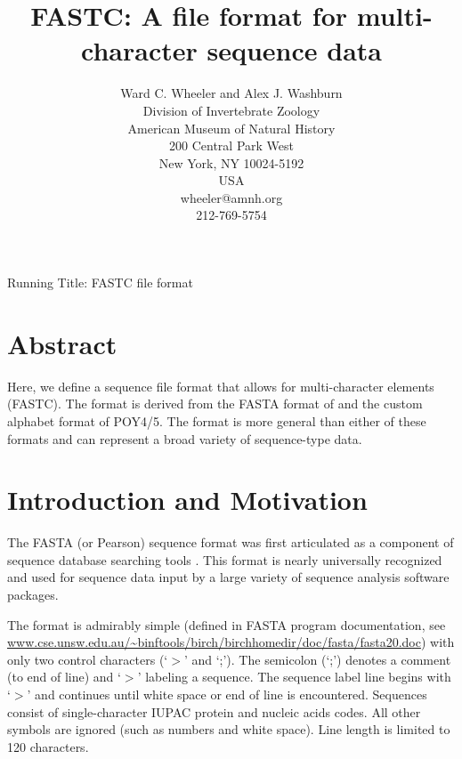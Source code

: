 \documentclass[12pt]{article}
\begin{document}
\title{FASTC: A file format for multi-character sequence data}
\author{Ward C. Wheeler and Alex J. Washburn \\
		Division of  Invertebrate Zoology\\
		American Museum of Natural History\\
		200 Central Park West\\
		New York, NY 10024-5192\\
		USA\\
		wheeler@amnh.org\\
		212-769-5754}

\maketitle
\begin{center}
Running Title: FASTC file format
\end{center}
\newpage
\doublespacing

\section{Abstract}
Here, we define a sequence file format that allows for multi-character elements (FASTC).  The format is derived from the FASTA format of and the custom alphabet format of POY4/5.  The format is more general than either of these formats and can represent a broad variety of sequence-type data.

\newpage
\tableofcontents
\newpage

\section{Introduction and Motivation}
The FASTA (or Pearson) sequence format was first articulated as a component of sequence database searching tools
\citep{LipmanandPearson1985}.  This format is nearly universally recognized and used for sequence data input 
by a large variety of sequence analysis software packages.

The format is admirably simple (defined in FASTA program documentation, see \url{www.cse.unsw.edu.au/~binftools/birch/birchhomedir/doc/fasta/fasta20.doc}) with 
only two control characters (`$>$' and `;').  The semicolon (`;') denotes a comment (to end of line) and `$>$' labeling a sequence.  
The sequence label line begins with `$>$' and continues until white space or end of line is encountered.  Sequences consist of single-character
IUPAC protein and nucleic acids codes.  All other symbols are ignored (such as numbers and white space).  Line length is limited to 120 characters.
\end{document}
